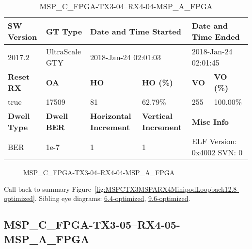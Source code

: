 \begin{table}[h]
\centering
\caption{MSP\_C\_FPGA-TX3-04--RX4-04-MSP\_A\_FPGA}
\label{tab:MSPCFPGATX304RX404MSPAFPGA12.8-optimized}
\begin{tabular}{@{}|l|l|l|l|l|l|@{}}
\toprule
\textbf{SW Version}                & \textbf{GT Type}   & \multicolumn{2}{l|}{\textbf{Date and Time Started}}            & \multicolumn{2}{l|}{\textbf{Date and Time Ended}}        \\ \midrule
2017.2                       & UltraScale GTY          & \multicolumn{2}{l|}{2018-Jan-24 02:01:03}                   & \multicolumn{2}{l|}{2018-Jan-24 02:01:45}               \\ \midrule
\textbf{Reset RX}                  & \textbf{OA} & \textbf{HO}   & \textbf{HO (\%)} & \textbf{VO} & \textbf{VO (\%)} \\ \midrule
true & 17509        & 81          & 62.79\%        & 255        & 100.00\%       \\ \midrule
\textbf{Dwell Type}                & \textbf{Dwell BER} & \textbf{Horizontal Increment} & \textbf{Vertical Increment}    & \multicolumn{2}{l|}{\textbf{Misc Info}}                  \\ \midrule
BER                            & 1e-7        & 1        & 1           & \multicolumn{2}{l|}{ELF Version: 0x4002 SVN: 0}                         \\ \bottomrule
\end{tabular}
\end{table}

\begin{figure}[h]
\caption{MSP\_C\_FPGA-TX3-04--RX4-04-MSP\_A\_FPGA} \label{fig:MSPCFPGATX304RX404MSPAFPGA12.8-optimized}
\end{figure}

Call back to summary Figure~\ref{fig:MSPCTX3MSPARX4MinipodLoopback12.8-optimized}.
Sibling eye diagrams: \hyperref[sec:MSPCFPGATX304RX404MSPAFPGA6.4-optimized]{6.4-optimized}, \hyperref[sec:MSPCFPGATX304RX404MSPAFPGA9.6-optimized]{9.6-optimized}.

\clearpage
\newpage


\subsection{MSP\_C\_FPGA-TX3-05--RX4-05-MSP\_A\_FPGA}\label{sec:MSPCFPGATX305RX405MSPAFPGA12.8-optimized}

